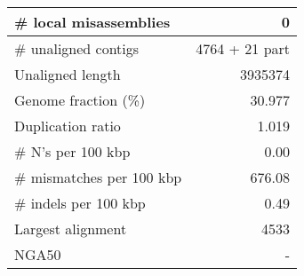 \documentclass[12pt,a4paper]{article}
\begin{document}
\begin{table}[ht]
\begin{center}
\begin{tabular}{|l*{1}{|r}|}
\# local misassemblies & 0 \\ \hline
\# unaligned contigs & 4764 + 21 part \\ \hline
Unaligned length & 3935374 \\ \hline
Genome fraction (\%) & 30.977 \\ \hline
Duplication ratio & 1.019 \\ \hline
\# N's per 100 kbp & 0.00 \\ \hline
\# mismatches per 100 kbp & 676.08 \\ \hline
\# indels per 100 kbp & 0.49 \\ \hline
Largest alignment & 4533 \\ \hline
NGA50 & - \\ \hline
\end{tabular}
\end{center}
\end{table}
\end{document}
